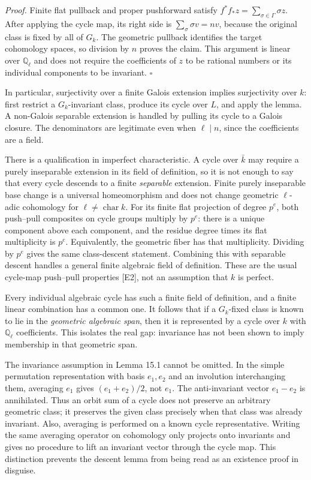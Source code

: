 \documentclass[11pt]{article}
\begin{document}
\emph{Proof.}
Finite flat pullback and proper pushforward satisfy
 $f^*f_*z=\sum_{\sigma\in\Gamma}\sigma z$. After applying the cycle map,
 its right side is $\sum_\sigma\sigma v=nv$, because the original class
 is fixed by all of $G_k$. The geometric pullback identifies the target
 cohomology spaces, so division by $n$ proves the claim. This argument is
 linear over $\mathbb Q_\ell$ and does not require the coefficients of $z$
 to be rational numbers or its individual components to be invariant.
\hfill$\square$

In particular, surjectivity over a finite Galois extension implies
 surjectivity over $k$: first restrict a $G_k$-invariant class, produce its
 cycle over $L$, and apply the lemma. A non-Galois separable extension is
 handled by pulling its cycle to a Galois closure. The denominators are
 legitimate even when $\ell\mid n$, since the coefficients are a field.

There is a qualification in imperfect characteristic. A cycle over
 $\bar k$ may require a purely inseparable extension in its field of
 definition, so it is not enough to say that every cycle descends to a
 finite \emph{separable} extension. Finite purely inseparable base change
 is a universal homeomorphism and does not change geometric \(\ell\)-adic
 cohomology for $\ell\ne\operatorname{char}k$. For its finite flat
 projection of degree $p^e$, both push--pull composites on cycle groups
 multiply by $p^e$: there is a unique component above each component,
 and the residue degree times its flat multiplicity is $p^e$.
 Equivalently, the geometric fiber has that
 multiplicity. Dividing by $p^e$ gives the same class-descent statement.
 Combining this with separable descent handles a general finite algebraic
 field of definition. These are the usual cycle-map push--pull properties
 [E2], not an assumption that $k$ is perfect.

Every individual algebraic cycle has such a finite field of definition,
 and a finite linear combination has a common one. It follows that if a
 $G_k$-fixed class is known to lie in the \emph{geometric algebraic span},
 then it is represented by a cycle over $k$ with $\mathbb Q_\ell$
 coefficients. This isolates the real gap: invariance has not been shown
 to imply membership in that geometric span.

The invariance assumption in Lemma 15.1 cannot be omitted. In the simple
 permutation representation with basis $e_1,e_2$ and an involution
 interchanging them, averaging $e_1$ gives $(e_1+e_2)/2$, not $e_1$.
 The anti-invariant vector $e_1-e_2$ is annihilated. Thus an orbit sum
 of a cycle does not preserve an arbitrary geometric class; it preserves
 the given class precisely when that class was already invariant.
 Also, averaging is performed on a known cycle representative. Writing
 the same averaging operator on cohomology only projects onto invariants
 and gives no procedure to lift an invariant vector through the cycle
 map. This distinction prevents the descent lemma from being read as
 an existence proof in disguise.
\end{document}
